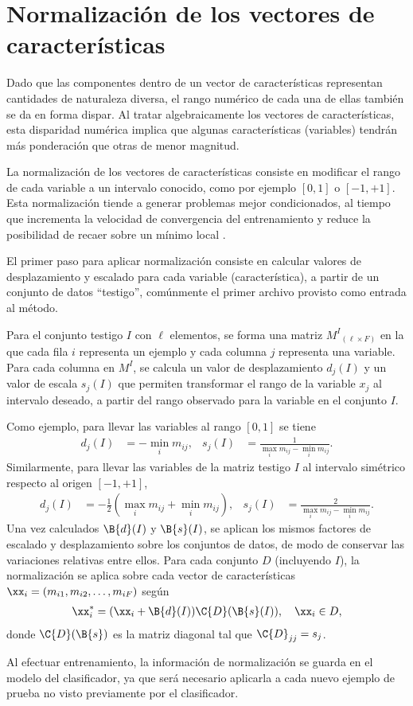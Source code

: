%
%
%
\section{Normalización de los vectores de características}
%
Dado que las componentes dentro de un vector de características
representan cantidades de naturaleza diversa, el rango numérico de
cada una de ellas también se da en forma dispar.  Al tratar
algebraicamente los vectores de características, esta disparidad
numérica implica que algunas características (variables) tendrán más
ponderación que otras de menor magnitud.

La normalización de los vectores de características consiste en
modificar el rango de cada variable a un intervalo conocido, como por
ejemplo $[0,1]$ o $[-1,+1]$. Esta normalización tiende a generar
problemas mejor condicionados, al tiempo que incrementa la velocidad
de convergencia del entrenamiento y reduce la posibilidad de recaer
sobre un mínimo local \cite{nnfaq2}.

El primer paso para aplicar normalización consiste en calcular valores
de desplazamiento y escalado para cada variable (característica), a
partir de un conjunto de datos ``testigo'', comúnmente el primer
archivo provisto como entrada al método.

Para el conjunto testigo $I$ con $\ell$ elementos, se forma una matriz
$M^I{}_{(\ell\times{}F)}$ en la que cada fila $i$ representa un
ejemplo y cada columna $j$ representa una variable. Para cada columna
en $M^I$, se calcula un valor de desplazamiento $d_j(I)$ y un valor de
escala $s_j(I)$ que permiten transformar el rango de la variable $x_j$
al intervalo deseado, a partir del rango observado para la variable en
el conjunto $I$.

Como ejemplo, para llevar las variables al rango $[0,1]$ se tiene
%
\begin{align}
  d_j(I) &= - \min_i m_{ij}, & s_j(I) &= \frac{1}{\max_i m_{ij} - \min_i m_{ij}}.
\end{align}
%
Similarmente, para llevar las variables de la matriz testigo $I$
al intervalo simétrico respecto al origen $[-1,+1]$,
%
\begin{align}
  d_j(I) &= - \frac{1}{2} \left(\max_i m_{ij} + \min_i m_{ij}\right), &
  s_j(I) &= \frac{2}{\max_i m_{ij} - \min_i m_{ij}}.
\end{align}
%
Una vez calculados $\B{d}(I)$ y $\B{s}(I)$, se aplican los mismos
factores de escalado y desplazamiento sobre  los conjuntos de
datos, de modo de conservar las variaciones relativas entre ellos.
Para cada conjunto $D$ (incluyendo $I$), la normalización se aplica
sobre cada vector de características $\xx_i = (m_{i1}, m_{i2}, \ldots,
m_{iF})$ según
%
\begin{align}
  \xx_i^{*} = (\xx_i + \B{d}(I)) \C{D}(\B{s}(I)),\quad \xx_i\in D,
\end{align}
%
donde $\C{D}(\B{s})$ es la matriz diagonal tal que $\C{D}_{jj}=s_j$.

Al efectuar entrenamiento, la información de normalización se guarda
en el modelo del clasificador, ya que será necesario aplicarla a cada
nuevo ejemplo de prueba no visto previamente por el clasificador.
